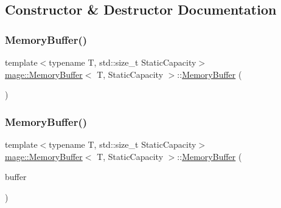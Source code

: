 \subsection{Constructor \& Destructor Documentation}
\mbox{\label{classmage_1_1_memory_buffer_a36be43b7c8eb071d3ee0abe54c45aa68}} 
\subsubsection{\texorpdfstring{Memory\+Buffer()}{MemoryBuffer()}\hspace{0.1cm}{\footnotesize\ttfamily [1/3]}}
{\footnotesize\ttfamily template$<$typename T, std\+::size\+\_\+t Static\+Capacity$>$ \\
\mbox{\hyperlink{classmage_1_1_memory_buffer}{mage\+::\+Memory\+Buffer}}$<$ T, Static\+Capacity $>$\+::\mbox{\hyperlink{classmage_1_1_memory_buffer}{Memory\+Buffer}} (\begin{DoxyParamCaption}{ }\end{DoxyParamCaption})}

\mbox{\label{classmage_1_1_memory_buffer_aa7c8dc3fb394917189de36139befe37b}} 
\subsubsection{\texorpdfstring{Memory\+Buffer()}{MemoryBuffer()}\hspace{0.1cm}{\footnotesize\ttfamily [2/3]}}
{\footnotesize\ttfamily template$<$typename T, std\+::size\+\_\+t Static\+Capacity$>$ \\
\mbox{\hyperlink{classmage_1_1_memory_buffer}{mage\+::\+Memory\+Buffer}}$<$ T, Static\+Capacity $>$\+::\mbox{\hyperlink{classmage_1_1_memory_buffer}{Memory\+Buffer}} (\begin{DoxyParamCaption}\item[{const \mbox{\hyperlink{classmage_1_1_memory_buffer}{Memory\+Buffer}}$<$ T, Static\+Capacity $>$ \&}]{buffer }\end{DoxyParamCaption})\hspace{0.3cm}{\ttfamily [delete]}}

